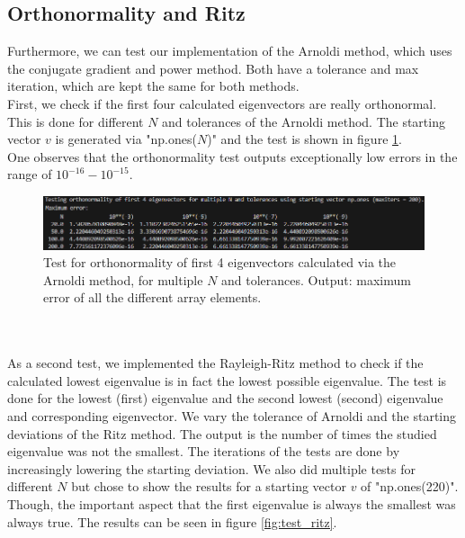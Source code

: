 \documentclass[11pt, letterpaper, onecolumn]{article}
\begin{document}
	
	\subsection{Orthonormality and Ritz}
	Furthermore, we can test our implementation of the Arnoldi method, which uses the conjugate gradient and power method. Both have a tolerance and max iteration, which are kept the same for both methods.\\
	First, we check if the first four calculated eigenvectors are really orthonormal. This is done for different $N$ and tolerances of the Arnoldi method. The starting vector $v$ is generated via "np.ones($N$)" and the test is shown in figure \ref{fig:test_orth}.\\
	One observes that the orthonormality test outputs exceptionally low errors in the range of $10^{-16}-10^{-15}$.
	\begin{figure} [H] 
	\begin{center}	
	\includegraphics[width=19cm]{"test_eigen_orth-tol.png"}
	\caption{Test for orthonormality of first 4 eigenvectors calculated via the Arnoldi method, for multiple $N$ and tolerances. Output: maximum error of all the different array elements.} \label{fig:test_orth}
	\end{center}
	\end{figure}
	\\
	\\
	As a second test, we implemented the Rayleigh-Ritz method to check if the calculated lowest eigenvalue is in fact the lowest possible eigenvalue. The test is done for the lowest (first) eigenvalue and the second lowest (second) eigenvalue and corresponding eigenvector. We vary the tolerance of Arnoldi and the starting deviations of the Ritz method. The output is the number of times the studied eigenvalue was not the smallest. The iterations of the tests are done by increasingly lowering the starting deviation. We also did multiple tests for different $N$ but chose to show the results for a starting vector $v$ of "np.ones(220)". Though, the important aspect that the first eigenvalue is always the smallest was always true. The results can be seen in figure \ref{fig:test_ritz}.
\end{document}
